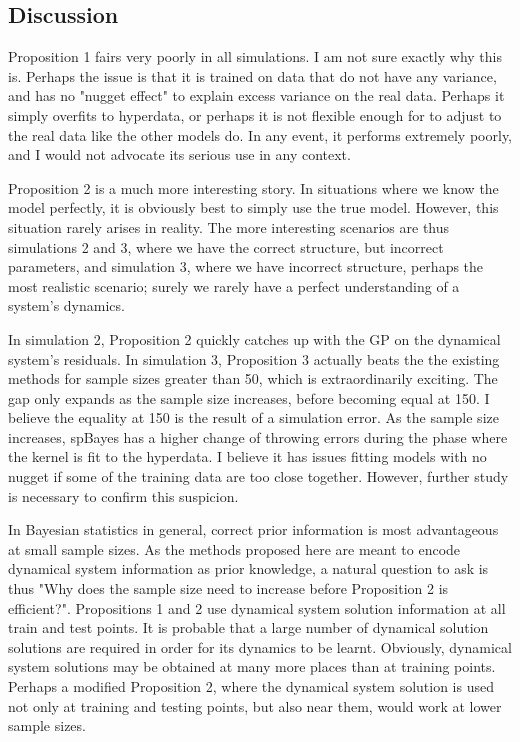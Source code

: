 \documentclass{article}
\begin{document}
	\subsection{Discussion}
	
	Proposition 1 fairs very poorly in all simulations. I am not sure exactly why this is. Perhaps the issue is that it is trained on data that do not have any variance, and has no "nugget effect" to explain excess variance on the real data. Perhaps it simply overfits to hyperdata, or perhaps it is not flexible enough for to adjust to the real data like the other models do. In any event, it performs extremely poorly, and I would not advocate its serious use in any context.
	
	Proposition 2 is a much more interesting story. In situations where we know the model perfectly, it is obviously best to simply use the true model. However, this situation rarely arises in reality. The more interesting scenarios are thus simulations 2 and 3, where we have the correct structure, but incorrect parameters, and simulation 3, where we have incorrect structure, perhaps the most realistic scenario; surely we rarely have a perfect understanding of a system's dynamics.
	
	In simulation 2, Proposition 2 quickly catches up with the GP on the dynamical system's residuals. In simulation 3, Proposition 3 actually beats the the existing methods for sample sizes greater than 50, which is extraordinarily exciting. The gap only expands as the sample size increases, before becoming equal at 150. I believe the equality at 150 is the result of a simulation error. As the sample size increases, spBayes has a higher change of throwing errors during the phase where the kernel is fit to the hyperdata. I believe it has issues fitting models with no nugget if some of the training data are too close together. However, further study is necessary to confirm this suspicion. 
	
	In Bayesian statistics in general, correct prior information is most advantageous at small sample sizes. As the methods proposed here are meant to encode dynamical system information as prior knowledge, a natural question to ask is thus "Why does the sample size need to increase before Proposition 2 is efficient?". Propositions 1 and 2 use dynamical system solution information at all train and test points. It is probable that a large number of dynamical solution solutions are required in order for its dynamics to be learnt. Obviously, dynamical system solutions may be obtained at many more places than at training points. Perhaps a modified Proposition 2, where the dynamical system solution is used not only at training and testing points, but also near them, would work at lower sample sizes.
	
\end{document}
